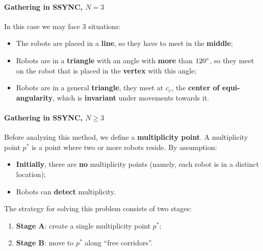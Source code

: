 
\paragraph{Gathering in SSYNC, $N = 3$} In this case we may face 3 situations:
\begin{itemize}
    \item The robots are placed in a \textbf{line}, so they have to meet in the \textbf{middle};
    \item Robots are in a \textbf{triangle} with an angle with \textbf{more} than $120\degree$, so they meet on the robot that is placed in the \textbf{vertex} with this angle;
    \item Robots are in a general \textbf{triangle}, they meet at $c_e$, the \textbf{center of equi-angularity}, which is \textbf{invariant} under movements towards it.
\end{itemize}

\paragraph{Gathering in SSYNC, $N \geq 3$} Before analyzing this method, we define a \textbf{multiplicity point}. A multiplicity point $p^*$ is a point where two or more robots reside. By assumption:
\begin{itemize}
    \item \textbf{Initially}, there are \textbf{no} multiplicity points (namely, each robot is in a distinct location);
    \item Robots can \textbf{detect} multiplicity.
\end{itemize}

The strategy for solving this problem consists of two stages:
\begin{enumerate}
    \item \textbf{Stage A}: create a single multiplicity point $p^*$;
    \item \textbf{Stage B}: move to $p^*$ along “free corridors”.
\end{enumerate}

